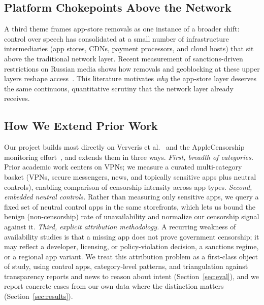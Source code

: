 \subsection{Platform Chokepoints Above the Network}

A third theme frames app-store removals as one instance of a broader shift:
control over speech has consolidated at a small number of infrastructure
intermediaries (app stores, CDNs, payment processors, and cloud hosts) that sit
above the traditional network layer. Recent measurement of sanctions-driven
restrictions on Russian media shows how removals and geoblocking at these upper
layers reshape access~\cite{internetsanctions2024}. This literature motivates
\emph{why} the app-store layer deserves the same continuous, quantitative
scrutiny that the network layer already receives.

\subsection{How We Extend Prior Work}

Our project builds most directly on Ververis et al.~\cite{ververis2019shedding}
and the AppleCensorship monitoring effort~\cite{applecensorship}, and extends
them in three ways. \emph{First, breadth of categories.} Prior academic work
centers on VPNs; we measure a curated multi-category basket (VPNs, secure
messengers, news, and topically sensitive apps plus neutral controls), enabling
comparison of censorship intensity across app types. \emph{Second, embedded
neutral controls.} Rather than measuring only sensitive apps, we query a fixed set
of neutral control apps in the same storefronts, which lets us bound the benign
(non-censorship) rate of unavailability and normalize our censorship signal
against it. \emph{Third, explicit attribution methodology.} A recurring weakness of
availability studies is that a missing app does not prove government censorship; it
may reflect a developer, licensing, or policy-violation decision, a sanctions
regime, or a regional app variant. We treat this attribution problem as a
first-class object of study, using control apps, category-level patterns, and
triangulation against transparency reports and news to reason about intent
(Section~\ref{sec:eval}), and we report concrete cases from our own data where the
distinction matters (Section~\ref{sec:results}).
